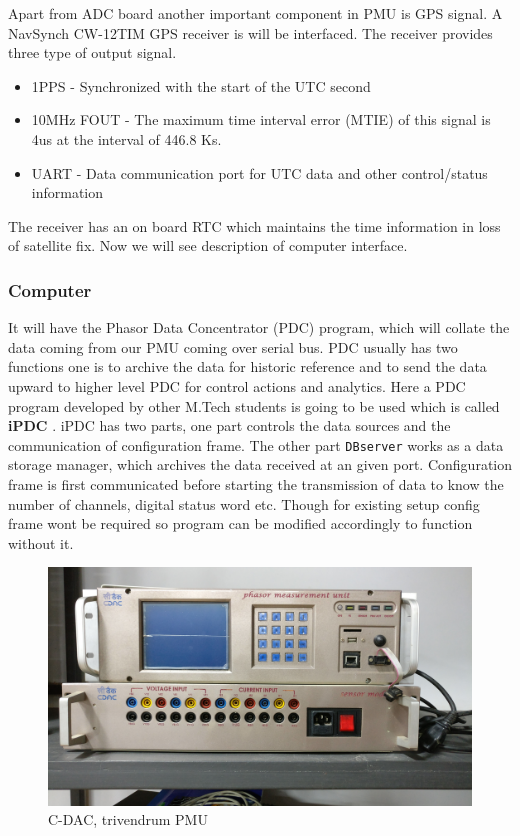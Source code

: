 Apart from ADC board another important component in PMU is GPS signal. A NavSynch CW-12TIM GPS receiver is will be interfaced. The receiver provides three type of output signal.
\begin{itemize}
\item 1PPS - Synchronized with the start of the UTC second
\item 10MHz FOUT - The maximum time interval error (MTIE) of this signal is 4us at the interval of 446.8 Ks.
\item UART - Data communication port for UTC data and other control/status information
\end{itemize}
The receiver has an on board RTC which maintains the time information in loss of satellite fix. Now we will see description of computer interface.

\subsubsection{Computer}
It will have the Phasor Data Concentrator (PDC) program, which will collate the data coming from our PMU coming over serial bus. PDC  usually has two functions one is to archive the data for historic reference and to send the data upward to higher level PDC for control actions and analytics. Here a PDC program developed by other M.Tech students is going to be used which is called \textbf{iPDC} \cite{site:ipdc}. iPDC has two parts, one part controls the data sources and the communication of configuration frame. The other part \texttt{DBserver} works as a data storage manager, which archives the data received at an given port. Configuration frame is first communicated before starting the transmission of data to know the number of channels, digital status word etc.
Though for existing setup config frame wont be required so program can be modified accordingly to function without it.

\begin{figure}[t]
\includegraphics[width=\textwidth]{fig/cdac_pmu.jpg}
\caption{C-DAC, trivendrum PMU}
\label{fig:cdac_pmu}
\end{figure}
